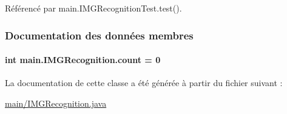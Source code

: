 Référencé par main.\+I\+M\+G\+Recognition\+Test.\+test().



\subsubsection{Documentation des données membres}
\hypertarget{classmain_1_1IMGRecognition_a5caedac76054d4d70d3fbc142c3fcf1b}{}
\paragraph[{count}]{\setlength{\rightskip}{0pt plus 5cm}int main.\+I\+M\+G\+Recognition.\+count = 0\hspace{0.3cm}{\ttfamily [static]}}\label{classmain_1_1IMGRecognition_a5caedac76054d4d70d3fbc142c3fcf1b}


La documentation de cette classe a été générée à partir du fichier suivant \+:\begin{DoxyCompactItemize}
\item 
\hyperlink{main_2IMGRecognition_8java}{main/\+I\+M\+G\+Recognition.\+java}\end{DoxyCompactItemize}
